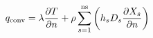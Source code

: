 \documentclass[10pt]{article}
\begin{document}
\begin{align*}q_{\rm conv} = \lambda \frac{ \partial T}{\partial n} + \rho \sum_{s=1}^{\rm ns} \left( h_{s} D_{s} \frac{ \partial X_{s} }{ \partial n} \right)\end{align*}
\end{document}
